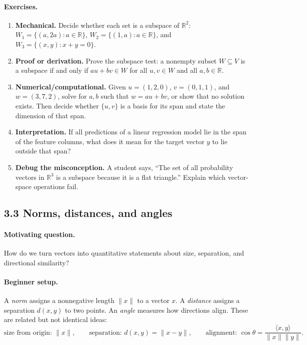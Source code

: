 \paragraph{Exercises.}
\begin{enumerate}[label=\textbf{3.2.\arabic*.}, leftmargin=*]
\item \textbf{Mechanical.} Decide whether each set is a subspace of \(\mathbb{R}^2\): \(W_1=\{(a,2a):a\in\mathbb{R}\}\), \(W_2=\{(1,a):a\in\mathbb{R}\}\), and \(W_3=\{(x,y):x+y=0\}\).
\item \textbf{Proof or derivation.} Prove the subspace test: a nonempty subset \(W\subseteq V\) is a subspace if and only if \(au+bv\in W\) for all \(u,v\in W\) and all \(a,b\in\mathbb{R}\).
\item \textbf{Numerical/computational.} Given \(u=(1,2,0)\), \(v=(0,1,1)\), and \(w=(3,7,2)\), solve for \(a,b\) such that \(w=au+bv\), or show that no solution exists. Then decide whether \(\{u,v\}\) is a basis for its span and state the dimension of that span.
\item \textbf{Interpretation.} If all predictions of a linear regression model lie in the span of the feature columns, what does it mean for the target vector \(y\) to lie outside that span?
\item \textbf{Debug the misconception.} A student says, ``The set of all probability vectors in \(\mathbb{R}^3\) is a subspace because it is a flat triangle.'' Explain which vector-space operations fail.
\end{enumerate}

\subsection{3.3 Norms, distances, and angles}

\paragraph{Motivating question.}
How do we turn vectors into quantitative statements about size, separation, and directional similarity?

\paragraph{Beginner setup.}
A \emph{norm} assigns a nonnegative length \(\|x\|\) to a vector \(x\). A \emph{distance} assigns a separation \(d(x,y)\) to two points. An \emph{angle} measures how directions align. These are related but not identical ideas:
\[
\text{size from origin: }\|x\|,
\qquad
\text{separation: }d(x,y)=\|x-y\|,
\qquad
\text{alignment: }\cos\theta=\frac{\langle x,y\rangle}{\|x\|\|y\|}.
\]

